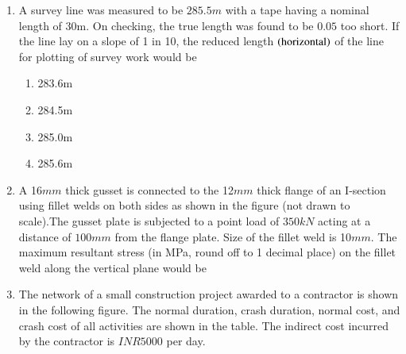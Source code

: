 \documentclass[journal,12pt,onecolumn]{IEEEtran}
\theoremstyle{remark}
\begin{document}
\begin{enumerate}
        
    \item A survey line was measured to be $285.5m$ with a tape having a nominal length of 30m. On 
        checking, the true length was found to be $0.05$ too short. If the line lay on a slope of 
        1 in 10, the reduced length $\left(\text{horizontal}\right)$ of the line for plotting of survey work
        would be
        \hfill{}
        \begin{multicols}{4}
            \begin{enumerate}
                \item 283.6m
                    \columnbreak
                \item 284.5m
                    \columnbreak
                \item 285.0m
                    \columnbreak
                \item 285.6m
            \end{enumerate}
        \end{multicols}
\item A 16$mm$ thick gusset is connected to the 12$mm$ thick flange of an I-section using fillet welds on
    both sides as shown in the figure (not drawn to scale).The gusset plate is subjected to a point load 
    of $350kN$ acting at a distance of $100mm$ from the flange plate. Size of the fillet weld is 10$mm$.
    The maximum resultant stress (in MPa, round off to 1 decimal place) on the fillet weld along the vertical plane would be
        \begin{center}
            \resizebox{0.5\textwidth}{!}{
                
            } 
        \end{center}
        \hfill{}
    \item The network of a small construction project awarded to a contractor is shown in the following
        figure. The normal duration, crash duration, normal cost, and crash cost of all activities are
        shown in the table. The indirect cost incurred by the contractor is $INR 5000$ per day.
        \begin{center}
            \resizebox{0.5\textwidth}{!}{
                
            } 
        \end{center}


\end{enumerate}
\end{document}
